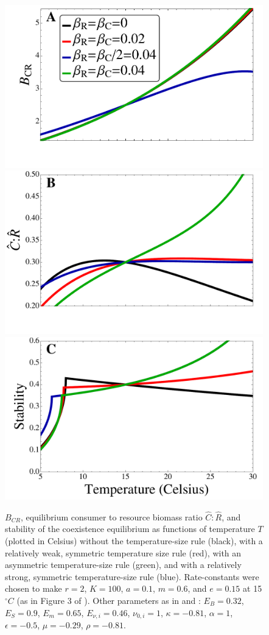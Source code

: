 \documentclass[11pt]{article}
\begin{document}
\begin{figure}[!ht]
\centering
\includegraphics[width=0.5\linewidth]{Figure2A}\\\vspace{-0.75cm}
\includegraphics[width=0.5\linewidth]{Figure2B}\\\vspace{-0.75cm}
\includegraphics[width=0.5\linewidth]{Figure2C}
\caption{
$B_{CR}$, equilibrium consumer to resource biomass ratio $\hat{C}:\hat{R}$, and stability of the coexistence equilibrium as functions of temperature $T$ (plotted in Celsius) without the temperature-size rule (black), with a relatively weak, symmetric temperature size rule (red), with an asymmetric temperature-size rule (green), and with a relatively strong, symmetric temperature-size rule (blue).
Rate-constants were chosen to make $r = 2$, $K = 100$, $a = 0.1$, $m = 0.6$, and $e = 0.15$ at 15$^\circ C$ (as in Figure 3 of \cite{Gilbert2014}).
Other parameters as in \cite{Gilbert2014} and \cite{DeLong2015}: $E_B = 0.32$, $E_S = 0.9$, $E_m = 0.65$, $E_{\nu,i} = 0.46$, $\nu_{0,i} = 1$, $\kappa = -0.81$, $\alpha = 1$, $\epsilon = -0.5$, $\mu = -0.29$, $\rho = -0.81$.
}
\label{StrengthAsymm}
\end{figure}
\end{document}
